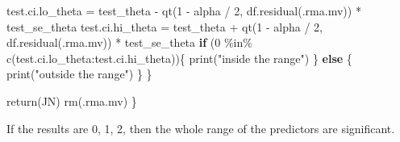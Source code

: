 \documentclass[
]{book}
\newenvironment{Shaded}{\begin{snugshade}}{\end{snugshade}}
\newcommand{\ControlFlowTok}[1]{\textcolor[rgb]{0.13,0.29,0.53}{\textbf{#1}}}
\newcommand{\DecValTok}[1]{\textcolor[rgb]{0.00,0.00,0.81}{#1}}
\newcommand{\FunctionTok}[1]{\textcolor[rgb]{0.00,0.00,0.00}{#1}}
\newcommand{\NormalTok}[1]{#1}
\newcommand{\OtherTok}[1]{\textcolor[rgb]{0.56,0.35,0.01}{#1}}
\newcommand{\SpecialCharTok}[1]{\textcolor[rgb]{0.00,0.00,0.00}{#1}}
\newcommand{\StringTok}[1]{\textcolor[rgb]{0.31,0.60,0.02}{#1}}
\begin{document}
\begin{Shaded}
\begin{Highlighting}[]
\NormalTok{        test.ci.lo\_theta }\OtherTok{=}\NormalTok{ test\_theta }\SpecialCharTok{{-}} \FunctionTok{qt}\NormalTok{(}\DecValTok{1} \SpecialCharTok{{-}}\NormalTok{ alpha }\SpecialCharTok{/} \DecValTok{2}\NormalTok{, }\FunctionTok{df.residual}\NormalTok{(.rma.mv)) }\SpecialCharTok{*}\NormalTok{ test\_se\_theta}
\NormalTok{        test.ci.hi\_theta }\OtherTok{=}\NormalTok{ test\_theta }\SpecialCharTok{+} \FunctionTok{qt}\NormalTok{(}\DecValTok{1} \SpecialCharTok{{-}}\NormalTok{ alpha }\SpecialCharTok{/} \DecValTok{2}\NormalTok{, }\FunctionTok{df.residual}\NormalTok{(.rma.mv)) }\SpecialCharTok{*}\NormalTok{ test\_se\_theta}
        \ControlFlowTok{if}\NormalTok{ (}\DecValTok{0} \SpecialCharTok{\%in\%} \FunctionTok{c}\NormalTok{(test.ci.lo\_theta}\SpecialCharTok{:}\NormalTok{test.ci.hi\_theta))\{}
            \FunctionTok{print}\NormalTok{(}\StringTok{"inside the range"}\NormalTok{)}
\NormalTok{        \} }\ControlFlowTok{else}\NormalTok{ \{}
            \FunctionTok{print}\NormalTok{(}\StringTok{"outside the range"}\NormalTok{)}
\NormalTok{        \}}
\NormalTok{    \}}
    
    
    \FunctionTok{return}\NormalTok{(JN)}
    \FunctionTok{rm}\NormalTok{(.rma.mv)}
\NormalTok{\}}
\end{Highlighting}
\end{Shaded}

If the results are 0, 1, 2, then the whole range of the predictors are significant.
\end{document}
